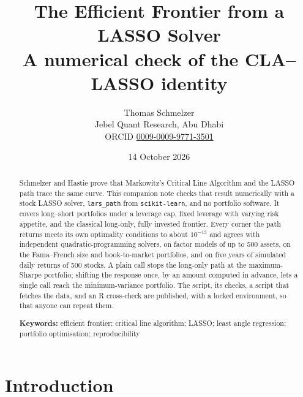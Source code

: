 \documentclass[11pt]{article}
\title{The Efficient Frontier from a LASSO Solver\\[6pt]
{\normalsize A numerical check of the CLA--LASSO identity}}
\author{Thomas Schmelzer\\[2pt]
{\small Jebel Quant Research, Abu Dhabi}\\[1pt]
{\small ORCID \href{https://orcid.org/0009-0009-9771-3501}{0009-0009-9771-3501}}}
\date{14 October 2026}
\begin{document}
\maketitle

\begin{abstract}
Schmelzer and Hastie prove that Markowitz's Critical Line Algorithm and the LASSO path
trace the same curve. This companion note checks that result numerically with a stock
LASSO solver, \texttt{lars\_path} from \texttt{scikit-learn}, and no portfolio software.
It covers long--short portfolios under a leverage cap, fixed leverage with varying risk
appetite, and the classical long-only, fully invested frontier. Every corner the path
returns meets its own optimality conditions to about $10^{-13}$ and agrees with
independent quadratic-programming solvers, on factor models of up to 500 assets, on the
Fama--French size and book-to-market portfolios, and on five years of simulated daily
returns of 500 stocks. A plain call stops the long-only path at the maximum-Sharpe
portfolio; shifting the response once, by an amount computed in advance, lets a single
call reach the minimum-variance portfolio. The script, its checks, a script that fetches
the data, and an R cross-check are published, with a locked environment, so that anyone
can repeat them.

\medskip\noindent
\textbf{Keywords:} efficient frontier; critical line algorithm; LASSO; least angle
regression; portfolio optimisation; reproducibility
\end{abstract}

\section{Introduction}
\end{document}
